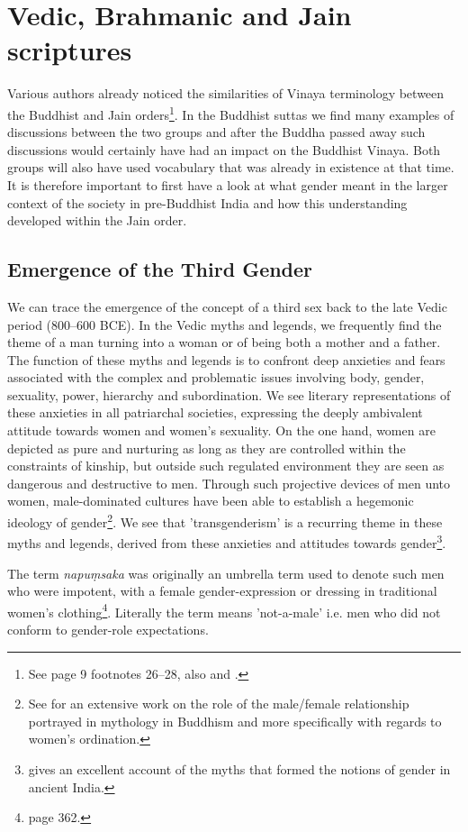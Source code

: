\section{Vedic, Brahmanic and Jain scriptures}

Various authors already noticed the similarities of Vinaya terminology between the Buddhist and Jain orders\footnote{See \cite{maes2016} page 9 footnotes 26–28, also \cite{sujato2009} and \cite{zwilling}.}. In the Buddhist suttas we find many examples of discussions between the two groups and after the Buddha passed away such discussions would certainly have had an impact on the Buddhist Vinaya. Both groups will also have used vocabulary that was already in existence at that time. It is therefore important to first have a look at what gender meant in the larger context of the society in pre-Buddhist India and how this understanding developed within the Jain order.

\subsection{Emergence of the Third Gender}
We can trace the emergence of the concept of a third sex back to the late Vedic period (800–600 BCE). In the Vedic myths and legends, we frequently find the theme of a man turning into a woman or of being both a mother and a father. The function of these myths and legends is to confront deep anxieties and fears associated with the complex and problematic issues involving body, gender, sexuality, power, hierarchy and subordination. We see literary representations of these anxieties in all patriarchal societies, expressing the deeply ambivalent attitude towards women and women's sexuality. On the one hand, women are depicted as pure and nurturing as long as they are controlled within the constraints of kinship, but outside such regulated environment they are seen as dangerous and destructive to men. Through such projective devices of men unto women, male-dominated cultures have been able to establish a hegemonic ideology of gender\footnote{See \cite{sujato2011} for an extensive work on the role of the male/female relationship portrayed in mythology in Buddhism and more specifically with regards to women's ordination.}. We see that 'transgenderism' is a recurring theme in these myths and legends, derived from these anxieties and attitudes towards gender\footnote{\cite{goldman} gives an excellent account of the myths that formed the notions of gender in ancient India.}.

The term {\em napuṃsaka} was originally an umbrella term used to denote such men who were impotent, with a female gender-expression or dressing in traditional women's clothing\footnote{\cite{zwilling} page 362.}. Literally the term means 'not-a-male' i.e. men who did not conform to gender-role expectations. 

